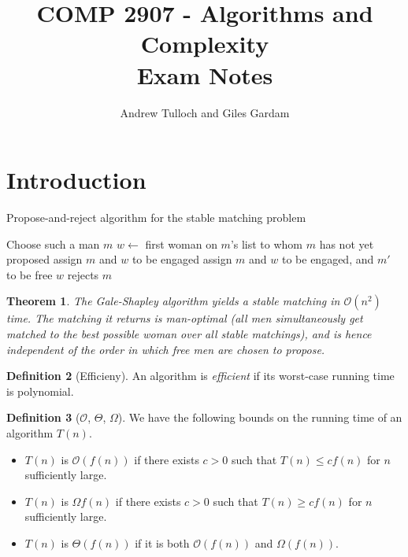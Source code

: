 \documentclass[10pt, oneside, reqno]{amsart}
\title{COMP 2907 - Algorithms and Complexity \\  Exam Notes}								%
\author{Andrew Tulloch and Giles Gardam}
\theoremstyle{plain}%
\newtheorem{thm}{Theorem}[section]
\theoremstyle{definition}
\newtheorem{defn}[thm]{Definition}
\theoremstyle{remark}
\newcommand{\bigo}[1]{\mathcal{O}(#1)}
\begin{document}
\maketitle

\section{Introduction} %
\label{sec:introduction}
\begin{algorithm}[H]
	\label{alg:dynamic_rising_trend}
	\caption{Propose-and-reject algorithm for the stable matching problem}
	\begin{algorithmic}[1]
			\State Choose such a man $m$
			\State $w \leftarrow $ first woman on $m$'s list to whom $m$ has not yet proposed 
				\State assign $m$ and $w$ to be engaged
				\State assign $m$ and $w$ to be engaged, and $m'$ to be free
			\Else
				\State $w$ rejects $m$
			\EndIf
		\EndWhile
	\EndProcedure
	\end{algorithmic}
\end{algorithm}

\begin{thm}
	The Gale-Shapley algorithm yields a stable matching in $\bigo{n^2}$ time. The matching it returns is man-optimal (all men simultaneously get matched to the best possible woman over all stable matchings), and is hence independent of the order in which free men are chosen to propose.
\end{thm}

\begin{defn}[Efficieny]
	An algorithm is \emph{efficient} if its worst-case running time is polynomial.	
\end{defn}

\begin{defn}[$\mathcal{O}$, $\Theta$, $\Omega$]
	We have the following bounds on the running time of an algorithm $T(n)$.
	\begin{itemize}
		\item $T(n)$ is $\bigo{f(n)}$ if there exists $c > 0$ such that $T(n) \leq c f(n)$ for $n$ sufficiently large.
		\item $T(n)$ is $\Omega{f(n)}$ if there exists $c > 0$ such that $T(n) \geq c f(n)$ for $n$ sufficiently large.
		
		\item $T(n)$ is $\Theta(f(n))$ if it is both $\bigo{f(n)}$ and $\Omega(f(n))$.
	\end{itemize}
\end{defn}
\end{document}
